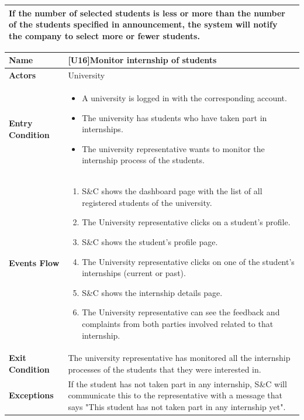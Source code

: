 \begin{center}
\begin{tabular}{|p{9em}|p{27em}|}
         If the number of selected students is less or more than the number of the students specified in announcement, the system will notify the company to 
         select more or fewer students.\\
        \hline
    \end{tabular}
\end{center}

\begin{center}
    \begin{tabular}{|p{9em}|p{27em}|}
        \hline
        \rowcolor{bluepoli!40} %
        \textbf{Name} & \textbf{[U16]Monitor internship of students} \\
        \hline
        \textbf{Actors} & University \\
        \hline
        \textbf{Entry Condition} & 
        \begin{itemize}
            \item A university is logged in with the corresponding account.
            \item The university has students who have taken part in internships.
            \item The university representative wants to monitor the internship process of the students.
        \end{itemize} \\
        \hline
        \textbf{Events Flow} & 
        \begin{enumerate}
            \item S\&C shows the dashboard page with the list of all registered students of the university.
            \item The University representative clicks on a student's profile.
            \item S\&C shows the student's profile page.
            \item The University representative clicks on one of the student's internships (current or past).
            \item S\&C shows the internship details page.
            \item The University representative can see the feedback and complaints from both parties involved related to that internship.
        \end{enumerate} \\
        \hline
        \textbf{Exit Condition} & The university representative has monitored all the internship processes of the students that they were
        interested in. \\
        \hline
        \textbf{Exceptions} & If the student has not taken part in any internship, S\&C will communicate this to the representative with a 
        message that says "This student has not taken part in any internship yet". \\
        \hline
    \end{tabular}
\end{center}



